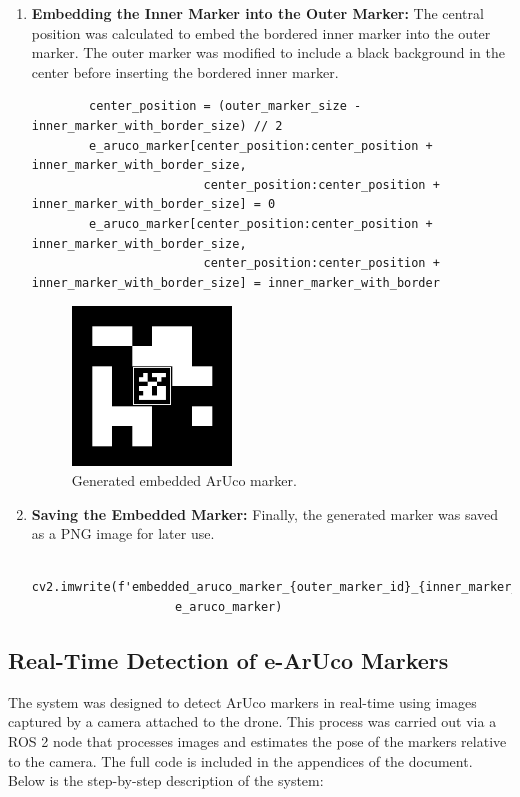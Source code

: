 \begin{enumerate}
    
        \item \textbf{Embedding the Inner Marker into the Outer Marker:} 
        The central position was calculated to embed the bordered inner marker into the outer marker. The outer marker was modified to include a black background in the center before inserting the bordered inner marker.
        \begin{verbatim}
        center_position = (outer_marker_size - inner_marker_with_border_size) // 2
        e_aruco_marker[center_position:center_position + inner_marker_with_border_size,
                        center_position:center_position + inner_marker_with_border_size] = 0
        e_aruco_marker[center_position:center_position + inner_marker_with_border_size,
                        center_position:center_position + inner_marker_with_border_size] = inner_marker_with_border
        \end{verbatim}
        \begin{center}
            \begin{figure}[H]
                \centering
                \includegraphics[width=0.4\textwidth]{pictures/embedded_aruco.png}
                \caption{Generated embedded ArUco marker.}
            \end{figure}
        \end{center}
    
        \item \textbf{Saving the Embedded Marker:} 
        Finally, the generated marker was saved as a PNG image for later use.
        \begin{verbatim}
        cv2.imwrite(f'embedded_aruco_marker_{outer_marker_id}_{inner_marker_id}.png', 
                    e_aruco_marker)
        \end{verbatim}
    \end{enumerate}    

\subsection{Real-Time Detection of e-ArUco Markers} 
The system was designed to detect ArUco markers in real-time using images captured by a camera attached to the drone. This process was carried out via a ROS 2 node that processes images and estimates the pose of the markers relative to the camera. The full code is included in the appendices of the document. Below is the step-by-step description of the system:

